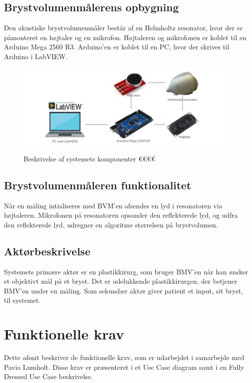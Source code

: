 		\subsection*{Brystvolumenmålerens opbygning}
		Den akustiske brystvolumenmåler består af en Helmholtz resonator, hvor der er påmonteret en højtaler og en mikrofon. Højtaleren og mikrofonen er koblet til en Arduino Mega 2560 R3. Arduino'en er koblet til en PC, hvor der skrives til Arduino i LabVIEW. \\ 
		
		\begin{figure}[htb]
			\centering
			\includegraphics[width=5in]{systembeskrivelse}
			\caption{Beskrivelse af systemets komponenter €€€€}
			\label{system}
		\end{figure}
	
		\subsection*{Brystvolumenmåleren funktionalitet}
		Når en måling intialiseres med BVM'en afsendes en lyd i resonatoren via højtaleren. Mikrofonen på resonatoren opsamler den reflekterede lyd, og udfra den reflekterede lyd, udregner en algoritme størrelsen på brystvolumen. 
	
		\subsection{Aktørbeskrivelse}
		Systemets primære aktør er en plastikkirurg, som bruger BMV'en når han ønsker et objektivt mål på et bryst. Det er udelukkende plastikkirurgen, der  betjener BMV'en under en måling. Som sekundær aktør giver patient et input, sit bryst, til systemet. 
	
	\section{Funktionelle krav}	
	Dette afsnit beskriver de funktionelle krav, som er udarbejdet i samarbejde med Pavia Lumholt. Disse krav er præsenteret i et Use Case diagram samt i en Fully Dressed Use Case beskrivelse.  
	
